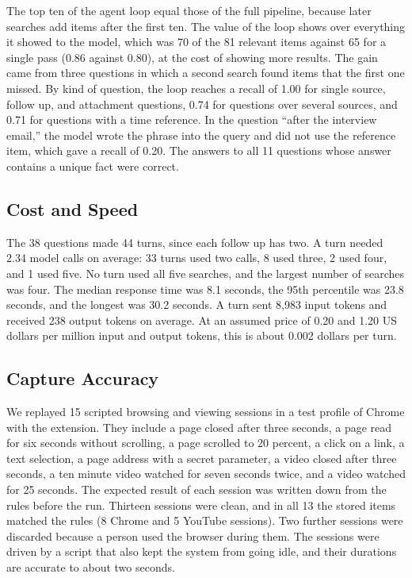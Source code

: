 \documentclass[conference]{IEEEtran}
\begin{document}
The top ten of the agent loop equal those of the full pipeline, because later searches add items after the first ten. The value of the loop shows over everything it showed to the model, which was 70 of the 81 relevant items against 65 for a single pass (0.86 against 0.80), at the cost of showing more results. The gain came from three questions in which a second search found items that the first one missed. By kind of question, the loop reaches a recall of 1.00 for single source, follow up, and attachment questions, 0.74 for questions over several sources, and 0.71 for questions with a time reference. In the question ``after the interview email,'' the model wrote the phrase into the query and did not use the reference item, which gave a recall of 0.20. The answers to all 11 questions whose answer contains a unique fact were correct.

\subsection{Cost and Speed}
The 38 questions made 44 turns, since each follow up has two. A turn needed 2.34 model calls on average: 33 turns used two calls, 8 used three, 2 used four, and 1 used five. No turn used all five searches, and the largest number of searches was four. The median response time was 8.1 seconds, the 95th percentile was 23.8 seconds, and the longest was 30.2 seconds. A turn sent 8,983 input tokens and received 238 output tokens on average. At an assumed price of 0.20 and 1.20 US dollars per million input and output tokens, this is about 0.002 dollars per turn.

\subsection{Capture Accuracy}
We replayed 15 scripted browsing and viewing sessions in a test profile of Chrome with the extension. They include a page closed after three seconds, a page read for six seconds without scrolling, a page scrolled to 20 percent, a click on a link, a text selection, a page address with a secret parameter, a video closed after three seconds, a ten minute video watched for seven seconds twice, and a video watched for 25 seconds. The expected result of each session was written down from the rules before the run. Thirteen sessions were clean, and in all 13 the stored items matched the rules (8 Chrome and 5 YouTube sessions). Two further sessions were discarded because a person used the browser during them. The sessions were driven by a script that also kept the system from going idle, and their durations are accurate to about two seconds.
\end{document}
